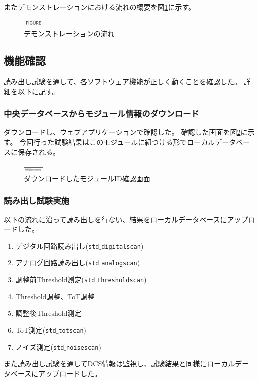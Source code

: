 またデモンストレーションにおける流れの概要を図\ref{demo_flow}に示す。

\begin{figure}[bpt]\centering
\includegraphics[width=1cm]{figure}
\caption[デモンストレーションの流れ]{デモンストレーションの流れ}
\label{demo_flow}
\end{figure}


\subsection{機能確認}
読み出し試験を通して、各ソフトウェア機能が正しく動くことを確認した。
詳細を以下に記す。

\subsubsection{中央データベースからモジュール情報のダウンロード}
ダウンロードし、ウェブアプリケーションで確認した。
確認した画面を図\ref{demo_download_SCC}に示す。
今回行った試験結果はこのモジュールに紐つける形でローカルデータベースに保存される。

\begin{figure}[bpt]\centering
\includegraphics[width=1cm]{demo_download_SCC}
\caption[ダウンロードしたモジュールID確認画面]{ダウンロードしたモジュールID確認画面}
\label{demo_download_SCC}
\end{figure}


\subsubsection{読み出し試験実施}
以下の流れに沿って読み出しを行ない、結果をローカルデータベースにアップロードした。
\begin{enumerate}
  \item デジタル回路読み出し(\texttt{std$\_$digitalscan})
  \item アナログ回路読み出し(\texttt{std$\_$analogscan})
  \item 調整前Threshold測定(\texttt{std$\_$thresholdscan})
  \item Threshold調整、ToT調整 
  \item 調整後Threshold測定
  \item ToT測定(\texttt{std$\_$totscan})
  \item ノイズ測定(\texttt{std$\_$noisescan})
\end{enumerate}
また読み出し試験を通してDCS情報は監視し、試験結果と同様にローカルデータベースにアップロードした。

